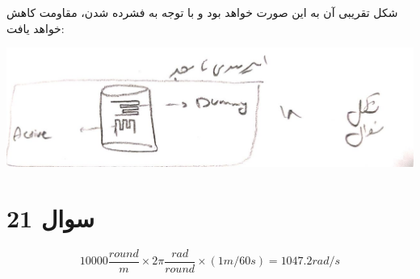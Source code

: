 \documentclass[12pt]{article}
\begin{document}
شکل تقریبی آن به این صورت خواهد بود  و با توجه به فشرده شدن، مقاومت کاهش خواهد یافت:

\begin{center}
	\includegraphics[width = 1.0 \textwidth]{images/6.png}
\end{center}


\newpage

\section*{سوال 21}

$$10000 \frac{round}{m} \times 2 \pi\frac{rad}{round} \times (1 m/ 60 s) = 1047.2 rad/s$$
\end{document}

